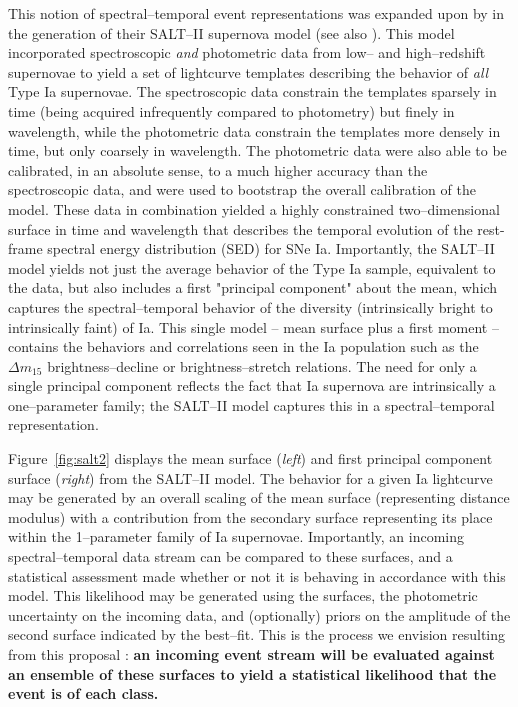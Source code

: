 This notion of spectral--temporal event representations was expanded upon  by
\cite{2007A&A...466...11G} in the generation of their SALT--II supernova model
(see also \cite{2007ApJ...663.1187H}).  This model incorporated spectroscopic
{\it and} photometric data from low-- and high--redshift supernovae to yield a
set of lightcurve templates describing the behavior of {\it all} Type Ia
supernovae. The spectroscopic data constrain the templates sparsely in time
(being acquired infrequently compared to photometry) but finely in wavelength,
while the photometric data constrain the templates more densely in time, but
only coarsely in wavelength.  The photometric data were also able to be
calibrated, in an absolute sense, to a much higher accuracy than the
spectroscopic data, and were used to bootstrap the overall calibration of the
model.  These data in combination yielded a highly constrained two--dimensional
surface in time and wavelength that describes the temporal evolution of the
rest-frame spectral energy distribution (SED) for SNe Ia. Importantly, the
SALT--II model yields not just the average behavior of the Type Ia sample,
equivalent to the \cite{2002PASP..114..803N} data, but also includes a first
"principal component" about the mean, which captures the spectral--temporal
behavior of the diversity (intrinsically bright to intrinsically faint) of Ia.
This single model -- mean surface plus a first moment -- contains the behaviors
and correlations seen in the Ia population such as the $\Delta m_{15}$
brightness--decline \citep{1993ApJ...413L.105P} or brightness--stretch
\citep{1998AJ....116.1009R} relations.  The need for only a single principal
component reflects the fact that Ia supernova are intrinsically a one--parameter
family; the SALT--II model captures this in a spectral--temporal representation.

Figure~\ref{fig:salt2} displays the mean surface ({\it left}) and first
principal component surface ({\it right}) from the SALT--II model.  The behavior
for a given Ia lightcurve may be generated by an overall scaling of the mean
surface (representing distance modulus) with a contribution from the secondary
surface representing its place within the 1--parameter family of Ia supernovae.
Importantly, an incoming spectral--temporal data stream can be compared to these
surfaces, and a statistical assessment made whether or not it is behaving in
accordance with this model.  This likelihood may be generated using the
surfaces, the photometric uncertainty on the incoming data, and (optionally)
priors on the amplitude of the second surface indicated by the best--fit.  This
is the process we envision resulting from this proposal : {\bf an incoming event
stream will be evaluated against an ensemble of these surfaces to yield a
statistical likelihood that the event is of each class.}


